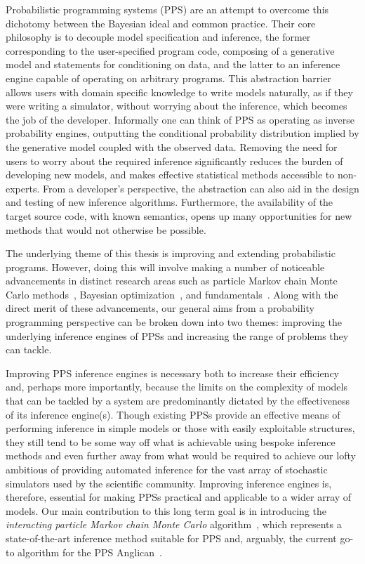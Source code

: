 Probabilistic programming systems (PPS) \citep{goodman2008church} are an attempt to
overcome this dichotomy between the Bayesian ideal and common practice.  Their core philosophy 
is to decouple model specification and inference, the former corresponding to the user-specified 
program code, composing of a generative model and statements for conditioning on data, and the 
latter to an inference engine capable of operating on arbitrary programs.  This abstraction barrier 
allows users with domain specific knowledge to write models naturally, as if they were writing a 
simulator, without worrying about the inference, which becomes the job of the developer. Informally 
one can think of PPS as operating as inverse probability engines, outputting the conditional 
probability distribution implied by the generative model coupled with the observed data.
Removing the need for users to worry about the required inference significantly reduces the 
burden of developing new models, and makes effective statistical methods accessible to 
non-experts.  From a developer's perspective, the abstraction can also aid in the design 
and testing of new inference algorithms.  Furthermore, the availability of the target source 
code, with known semantics, opens up many opportunities for new methods that would
not otherwise be possible.

The underlying theme of this thesis is improving and extending probabilistic programs.  However,
doing this will involve making a number of noticeable advancements in  distinct research areas such
as particle Markov chain Monte Carlo methods~\citep{andrieu2010particle},
Bayesian optimization~\citep{movckus1975bayesian}, and \mc
fundamentals~\citep{metropolis1949monte}.  Along with the direct merit of
these advancements, our general aims from a probability programming perspective can be
broken down into two themes: improving the underlying inference engines of PPSs and increasing the
range of problems they can tackle.

Improving PPS inference engines is necessary both to increase their efficiency and,
perhaps more importantly, because the limits on the
complexity of models that can be tackled by a system are predominantly dictated by the 
effectiveness of its inference engine(s).  
 Though existing PPSs provide an effective means of performing
inference in simple models or those with easily exploitable structures, they still tend to be
some way off what is achievable using bespoke inference methods and even further away from
what would be required to achieve our lofty ambitious of providing automated inference for
the vast array of stochastic simulators used by the scientific community.  
Improving inference engines is, therefore, essential for making PPSs practical and applicable 
to a wider array of models.
Our main contribution
to this long term goal is in introducing the \emph{interacting particle Markov chain Monte Carlo}
algorithm~\citep{rainforth2016interacting}, which represents a state-of-the-art inference method
suitable for PPS and, arguably, the current go-to algorithm for the PPS Anglican~\citep{wood2014new}.

